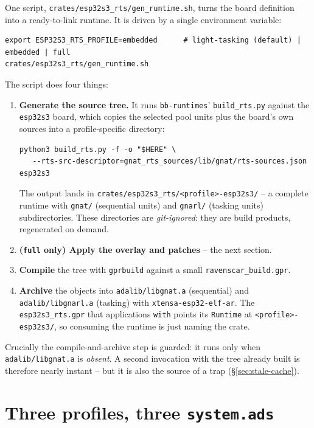 One script, \texttt{crates/esp32s3\_rts/gen\_runtime.sh}, turns the board
definition into a ready-to-link runtime. It is driven by a single environment
variable:

\begin{lstlisting}[style=sh]
export ESP32S3_RTS_PROFILE=embedded      # light-tasking (default) | embedded | full
crates/esp32s3_rts/gen_runtime.sh
\end{lstlisting}

The script does four things:

\begin{enumerate}
\item \textbf{Generate the source tree.} It runs \texttt{bb-runtimes}'
  \texttt{build\_rts.py} against the \texttt{esp32s3} board, which copies the
  selected pool units plus the board's own sources into a profile-specific
  directory:
\begin{lstlisting}[style=sh]
python3 build_rts.py -f -o "$HERE" \
   --rts-src-descriptor=gnat_rts_sources/lib/gnat/rts-sources.json esp32s3
\end{lstlisting}
  The output lands in \texttt{crates/esp32s3\_rts/<profile>-esp32s3/} -- a
  complete runtime with \texttt{gnat/} (sequential units) and \texttt{gnarl/}
  (tasking units) subdirectories. These directories are \emph{git-ignored}: they
  are build products, regenerated on demand.
\item \textbf{(\texttt{full} only) Apply the overlay and patches} -- the next
  section.
\item \textbf{Compile} the tree with \texttt{gprbuild} against a small
  \texttt{ravenscar\_build.gpr}.
\item \textbf{Archive} the objects into \texttt{adalib/libgnat.a} (sequential)
  and \texttt{adalib/libgnarl.a} (tasking) with \texttt{xtensa-esp32-elf-ar}.
  The \texttt{esp32s3\_rts.gpr} that applications \texttt{with} points its
  \texttt{Runtime} at \texttt{<profile>-esp32s3/}, so consuming the runtime is
  just naming the crate.
\end{enumerate}

Crucially the compile-and-archive step is guarded: it runs only when
\texttt{adalib/libgnat.a} is \emph{absent}. A second invocation with the tree
already built is therefore nearly instant -- but it is also the source of a trap
(\S\ref{sec:stale-cache}).

\section{Three profiles, three \texttt{system.ads}}

